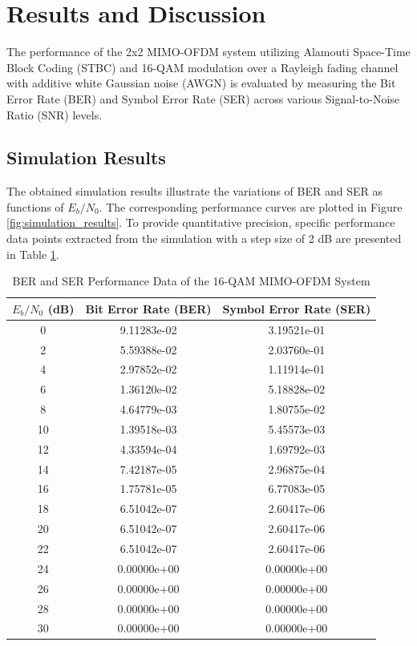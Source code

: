 \documentclass[a4paper]{article}
\begin{document}
\section{Results and Discussion}
The performance of the 2x2 MIMO-OFDM system utilizing Alamouti Space-Time Block Coding (STBC) and 16-QAM modulation over a Rayleigh fading channel with additive white Gaussian noise (AWGN) is evaluated by measuring the Bit Error Rate (BER) and Symbol Error Rate (SER) across various Signal-to-Noise Ratio (SNR) levels.

\subsection{Simulation Results}
The obtained simulation results illustrate the variations of BER and SER as functions of $E_b/N_0$. The corresponding performance curves are plotted in Figure \ref{fig:simulation_results}. To provide quantitative precision, specific performance data points extracted from the simulation with a step size of 2 dB are presented in Table \ref{tab:results_detailed}.

\begin{table}[H]
\centering
\caption{BER and SER Performance Data of the 16-QAM MIMO-OFDM System}
\label{tab:results_detailed}
\vspace{0.2cm}
\begin{tabular}{ccc}
\toprule
\textbf{$E_b/N_0$ (dB)} & \textbf{Bit Error Rate (BER)} & \textbf{Symbol Error Rate (SER)} \\
\midrule
0  & 9.11283e-02 & 3.19521e-01 \\
2  & 5.59388e-02 & 2.03760e-01 \\
4  & 2.97852e-02 & 1.11914e-01 \\
6  & 1.36120e-02 & 5.18828e-02 \\
8  & 4.64779e-03 & 1.80755e-02 \\
10 & 1.39518e-03 & 5.45573e-03 \\
12 & 4.33594e-04 & 1.69792e-03 \\
14 & 7.42187e-05 & 2.96875e-04 \\
16 & 1.75781e-05 & 6.77083e-05 \\
18 & 6.51042e-07 & 2.60417e-06 \\
20 & 6.51042e-07 & 2.60417e-06 \\
22 & 6.51042e-07 & 2.60417e-06 \\
24 & 0.00000e+00 & 0.00000e+00 \\
26 & 0.00000e+00 & 0.00000e+00 \\
28 & 0.00000e+00 & 0.00000e+00 \\
30 & 0.00000e+00 & 0.00000e+00 \\
\bottomrule
\end{tabular}
\end{table}
\end{document}
